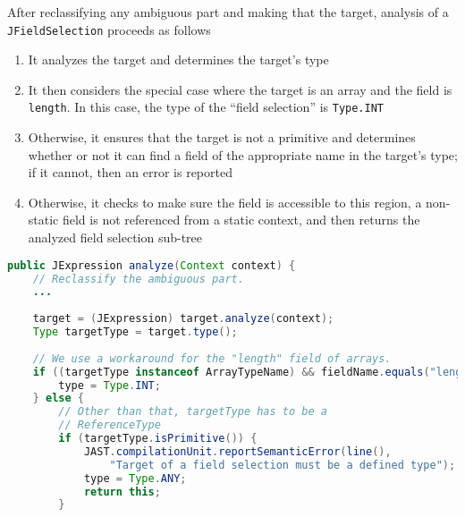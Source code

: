 \documentclass[8pt,a4paper,compress]{beamer}
\begin{document}
\begin{frame}[fragile]
\pause

After reclassifying any ambiguous part and making that the target, analysis of a \lstinline{JFieldSelection} proceeds as follows
\begin{enumerate}
\item It analyzes the target and determines the target's type
\item It then considers the special case where the target is an array and the field is \lstinline{length}.  In this case, the type of the ``field selection'' is \lstinline{Type.INT}
\item Otherwise, it ensures that the target is not a primitive and determines whether or not it can find a field of the appropriate name in the target's type; if it cannot, then an error is reported
\item Otherwise, it checks to make sure the field is accessible to this region, a non-static field is not referenced from a static context, and then returns the analyzed field selection sub-tree
\end{enumerate}

\pause
\bigskip

\begin{lstlisting}[language=Java]
public JExpression analyze(Context context) {
    // Reclassify the ambiguous part.
    ...
    
    target = (JExpression) target.analyze(context);
    Type targetType = target.type();
    
    // We use a workaround for the "length" field of arrays.
    if ((targetType instanceof ArrayTypeName) && fieldName.equals("length")) {
        type = Type.INT;
    } else {
        // Other than that, targetType has to be a
        // ReferenceType
        if (targetType.isPrimitive()) {
            JAST.compilationUnit.reportSemanticError(line(),
                "Target of a field selection must be a defined type");
            type = Type.ANY;
            return this;
        }
\end{lstlisting}
\end{frame}
\end{document}
